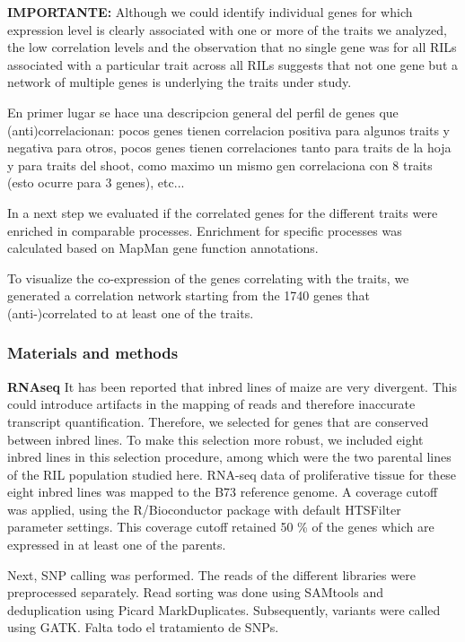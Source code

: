 \documentclass[a4paper,10pt]{article}
\begin{document}
\textbf{IMPORTANTE:} Although we could identify individual genes for which expression level is clearly associated with one or more of the traits we analyzed, the low correlation levels and the observation
that no single gene was for all RILs associated with a particular trait across all RILs suggests that not one gene but a network of multiple genes is underlying the traits under study.

En primer lugar se hace una descripcion general del perfil de genes que (anti)correlacionan: 
pocos genes tienen correlacion positiva para algunos traits y negativa para otros, 
pocos genes tienen correlaciones tanto para traits de la hoja y para traits del shoot, 
como maximo un mismo gen correlaciona con 8 traits (esto ocurre para 3 genes), 
etc... 


In a next step we evaluated if the correlated genes for the different traits were enriched in comparable processes. 
Enrichment for specific processes was calculated based on MapMan gene function annotations.


To visualize the co-expression of the genes correlating with the traits, we generated a correlation network starting from the 1740 genes that (anti-)correlated to at least one of the traits.


\subsubsection{Materials and methods}

\textbf{RNAseq} It has been reported that inbred lines of maize are very divergent. 
This could introduce artifacts in the mapping of reads and therefore inaccurate transcript quantification. 
Therefore, we selected for genes that are conserved between inbred lines. 
To make this selection more robust, we included eight inbred lines in this selection procedure, among which were the two parental lines of the RIL population studied here. 
RNA-seq data of proliferative tissue for these eight inbred lines was mapped to the B73 reference genome.
A coverage cutoff was applied, using the R/Bioconductor package with default HTSFilter parameter settings.
This coverage cutoff retained 50 \% of the genes which are expressed in at least one of the parents.

Next, SNP calling was performed. The reads of the different libraries were preprocessed separately. 
Read sorting was done using SAMtools and deduplication using Picard MarkDuplicates.
Subsequently, variants were called using GATK.
Falta todo el tratamiento de SNPs.
\end{document}
